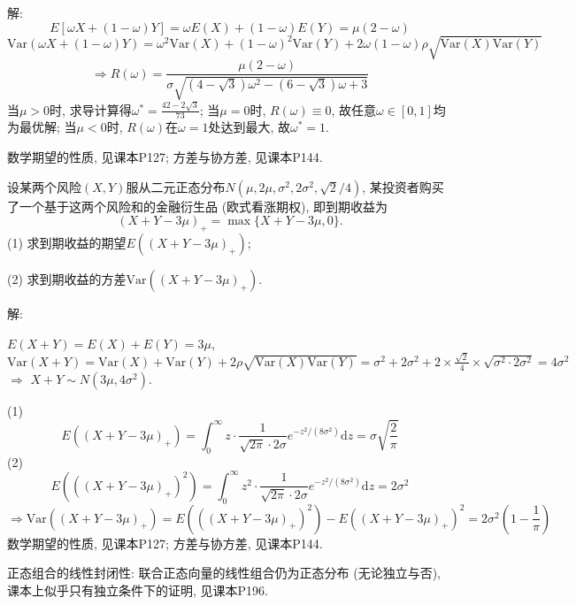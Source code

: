 \documentclass[standard]{ExBook}
\renewenvironment{shaded}{%
  \def\FrameCommand{\fboxsep=\FrameSep \colorbox{shadecolor}}%
  \MakeFramed{\advance\hsize-\width \FrameRestore}%
}{%
  \endMakeFramed
}
\begin{document}
\begin{qitems}
\vspace{\dimexpr2.5cm-5em\relax}

解: 
$$E[\omega X+(1-\omega)Y]=\omega E(X)+(1-\omega)E(Y)=\mu(2-\omega)$$
$$\mathrm{Var}(\omega X+(1-\omega)Y)=\omega^2 \mathrm{Var}(X)+(1-\omega)^2 \mathrm{Var}(Y)+2\omega(1-\omega)\rho\sqrt{\mathrm{Var}(X)\mathrm{Var}(Y)}$$
$$\Longrightarrow R(\omega)=\displaystyle\frac{\mu(2-\omega)}{\sigma\sqrt{(4-\sqrt{3})\omega^2-(6-\sqrt{3})\omega+3}}$$
当$\mu>0$时, 求导计算得$\omega^{*}=\displaystyle\frac{42-2\sqrt{3}}{73}$; 当$\mu=0$时, $R(\omega)\equiv0$, 故任意$\omega\in[0,1]$均为最优解; 当$\mu<0$时, $R(\omega)$在$\omega=1$处达到最大, 故$\omega^{*}=1$.

\textcolor{themeColor}{\selectfont {} 数学期望的性质, 见课本P127; 方差与协方差, 见课本P144.}

\vspace{2.5cm-5em}

    \begin{bbox}
    \begin{shaded}
        \qitem
设某两个风险$ ( X , Y ) $服从二元正态分布$N(\mu,2\mu,\sigma^2,2\sigma^2,\sqrt{2}/4)$, 某投资者购买了一个基于这两个风险和的金融衍生品 (欧式看涨期权), 即到期收益为
$$(X+Y-3\mu)_{+}=\max\{X+Y-3\mu,0\}.$$
(1) 求到期收益的期望$E((X+Y-3\mu)_+)$;

(2) 求到期收益的方差$\mathrm{Var}((X+Y-3\mu)_+)$.
    \end{shaded}
    \end{bbox}

\vspace{\dimexpr2.5cm-5em\relax}

解: 

$E(X+Y)=E(X)+E(Y)=3\mu$, $\mathrm{Var}(X+Y)=\mathrm{Var}(X)+\mathrm{Var}(Y)+2\rho\sqrt{\mathrm{Var}(X)\mathrm{Var}(Y)}=\sigma^2+2\sigma^2+2\times\frac{\sqrt{2}}{4}\times\sqrt{\sigma^2\cdot2\sigma^2}=4\sigma^2$ $\Longrightarrow$ $X+Y\sim N(3\mu,4\sigma^2)$.

(1)
$$E((X+Y-3\mu)_+)=\displaystyle\int_{0}^{\infty}z\cdot \frac{1}{\sqrt{2\pi}\cdot2\sigma}e^{-z^2/(8\sigma^2)}\mathrm{d}z=\sigma\sqrt{\frac{2}{\pi}}$$
(2)
$$E(((X+Y-3\mu)_+)^2)=\displaystyle\int_{0}^{\infty}z^2\cdot \frac{1}{\sqrt{2\pi}\cdot2\sigma}e^{-z^2/(8\sigma^2)}\mathrm{d}z=2\sigma^2$$
$$\Longrightarrow \mathrm{Var}((X+Y-3\mu)_+)=E(((X+Y-3\mu)_+)^2)-E((X+Y-3\mu)_+)^2=2\sigma^2\left(1-\frac{1}{\pi}\right)$$
\textcolor{themeColor}{\selectfont {} 数学期望的性质, 见课本P127; 方差与协方差, 见课本P144.}

\textcolor{themeColor}{\selectfont {} 正态组合的线性封闭性: 联合正态向量的线性组合仍为正态分布 (无论独立与否), 课本上似乎只有独立条件下的证明, 见课本P196.}


\end{qitems}
\end{document}
